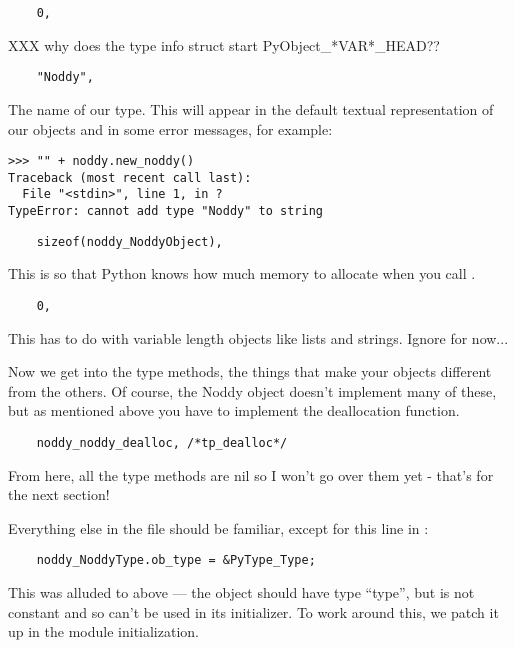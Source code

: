 \begin{verbatim}
    0,
\end{verbatim}

XXX why does the type info struct start PyObject_*VAR*_HEAD??

\begin{verbatim}
    "Noddy",
\end{verbatim}

The name of our type.  This will appear in the default textual
representation of our objects and in some error messages, for example:

\begin{verbatim}
>>> "" + noddy.new_noddy()
Traceback (most recent call last):
  File "<stdin>", line 1, in ?
TypeError: cannot add type "Noddy" to string
\end{verbatim}

\begin{verbatim}
    sizeof(noddy_NoddyObject),
\end{verbatim}

This is so that Python knows how much memory to allocate when you call
.

\begin{verbatim}
    0,
\end{verbatim}

This has to do with variable length objects like lists and strings.
Ignore for now...

Now we get into the type methods, the things that make your objects
different from the others.  Of course, the Noddy object doesn't
implement many of these, but as mentioned above you have to implement
the deallocation function.

\begin{verbatim}
    noddy_noddy_dealloc, /*tp_dealloc*/
\end{verbatim}

From here, all the type methods are nil so I won't go over them yet -
that's for the next section!

Everything else in the file should be familiar, except for this line
in :

\begin{verbatim}
    noddy_NoddyType.ob_type = &PyType_Type;
\end{verbatim}

This was alluded to above --- the  object should
have type ``type'', but  is not constant and so
can't be used in its initializer.  To work around this, we patch it up
in the module initialization.


